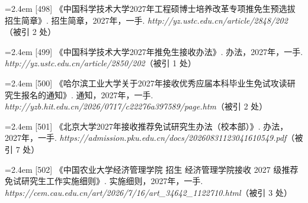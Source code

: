 {\vspace{0.6pt}
\vspace{3.5pt}\par
\nopagebreak\vspace{1pt}
\noindent\hangindent=2.4em \label{src:S0673}{\color{cAccent}[498]} 《中国科学技术大学2027年工程硕博士培养改革专项推免生预选拔招生简章》. 招生简章，2027年，一手. \textit{http://yz.ustc.edu.cn/article/2848/202}（被引 2 处）\par
\vspace{0.6pt}
\noindent\hangindent=2.4em \label{src:S0675}{\color{cAccent}[499]} 《中国科学技术大学2027年推免生接收办法》. 办法，2027年，一手. \textit{http://yz.ustc.edu.cn/article/2850/202}（被引 1 处）\par
\vspace{0.6pt}
\vspace{3.5pt}\par
\nopagebreak\vspace{1pt}
\noindent\hangindent=2.4em \label{src:S0678}{\color{cAccent}[500]} 《哈尔滨工业大学关于2027年接收优秀应届本科毕业生免试攻读研究生报名的通知》. 通知，2027年，一手. \textit{http://yzb.hit.edu.cn/2026/0717/c22276a397589/page.htm}（被引 2 处）\par
\vspace{0.6pt}
\vspace{3.5pt}\par
\nopagebreak\vspace{1pt}
\noindent\hangindent=2.4em \label{src:S0682}{\color{cAccent}[501]} 《北京大学2027年接收推荐免试研究生办法（校本部）》. 办法，2027年，一手. \textit{https://admission.pku.edu.cn/docs/20260831123041610549.pdf}（被引 7 处）\par
\vspace{0.6pt}
\vspace{3.5pt}\par
\nopagebreak\vspace{1pt}
\noindent\hangindent=2.4em \label{src:S0684}{\color{cAccent}[502]} 《中国农业大学经济管理学院 招生 经济管理学院接收 2027 级推荐免试研究生工作实施细则》. 实施细则，2027年，一手. \textit{https://cem.cau.edu.cn/art/2026/7/16/art\_34642\_1122710.html}（被引 3 处）\par
\vspace{0.6pt}
\vspace{3.5pt}\par
}
